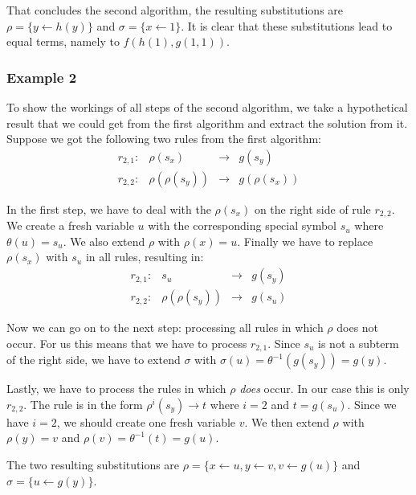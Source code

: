 That concludes the second algorithm, the resulting substitutions are $\rho = \{ y \leftarrow h(y) \}$ and $\sigma = \{ x \leftarrow 1 \}$. It is clear that these substitutions lead to equal terms, namely to $f(h(1), g(1, 1))$. 

\subsubsection*{Example 2}
To show the workings of all steps of the second algorithm, we take a hypothetical result that we could get from the first algorithm and extract the solution from it. Suppose we got the following two rules from the first algorithm:
$$
\begin{array}{lrcl}
    r_{2,1}: & \rho(s_x) & \rightarrow & g(s_y) \\
    r_{2,2}: & \rho(\rho(s_y)) & \rightarrow & g(\rho(s_x))
\end{array}
$$

In the first step, we have to deal with the $\rho(s_x)$ on the right side of rule $r_{2,2}$. We create a fresh variable $u$ with the corresponding special symbol $s_u$ where $\theta(u) = s_u$. We also extend $\rho$ with $\rho(x) = u$. Finally we have to replace $\rho(s_x)$ with $s_u$ in all rules, resulting in:
$$
\begin{array}{lrcl}
    r_{2,1}: & s_u & \rightarrow & g(s_y) \\
    r_{2,2}: & \rho(\rho(s_y)) & \rightarrow & g(s_u)
\end{array}
$$

Now we can go on to the next step: processing all rules in which $\rho$ does not occur. For us this means that we have to process $r_{2,1}$. Since $s_u$ is not a subterm of the right side, we have to extend $\sigma$ with $\sigma(u) = \theta^{-1}(g(s_y)) = g(y)$. 

Lastly, we have to process the rules in which $\rho$ \textit{does} occur. In our case this is only $r_{2,2}$. The rule is in the form $\rho^i(s_y) \rightarrow t$ where $i = 2$ and $t = g(s_u)$. Since we have $i = 2$, we should create one fresh variable $v$. We then extend $\rho$ with $\rho(y) = v$ and $\rho(v) = \theta^{-1}(t) = g(u)$. 

The two resulting substitutions are $\rho = \{ x \leftarrow u, y \leftarrow v, v \leftarrow g(u) \}$ and $\sigma = \{ u \leftarrow g(y) \}$.
